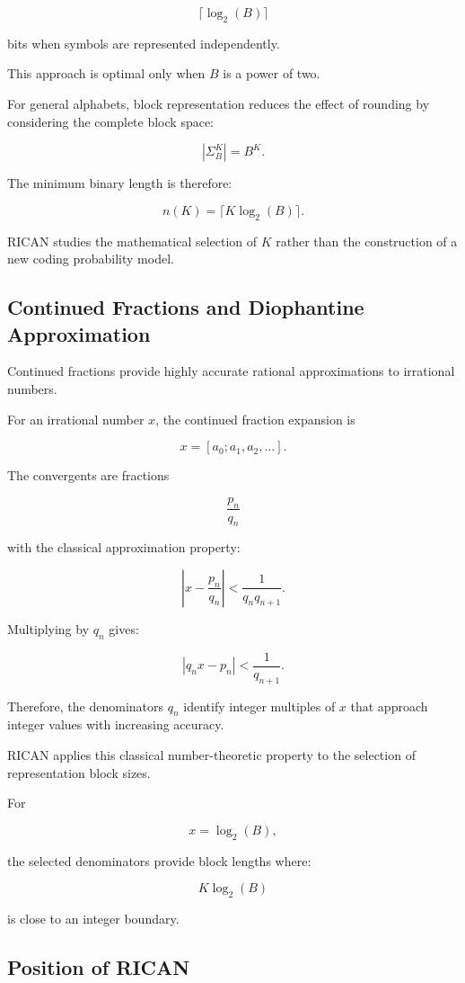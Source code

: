 \documentclass[onecolumn]{IEEEtran}
\begin{document}
\[
\lceil\log_2(B)\rceil
\]

bits when symbols are represented independently.

This approach is optimal only when $B$ is a power of two.

For general alphabets, block representation reduces the effect of
rounding by considering the complete block space:

\[
|\Sigma_B^K|=B^K .
\]

The minimum binary length is therefore:

\[
n(K)=\lceil K\log_2(B)\rceil .
\]

RICAN studies the mathematical selection of $K$ rather than the
construction of a new coding probability model.

\subsection{Continued Fractions and Diophantine Approximation}

Continued fractions provide highly accurate rational approximations to
irrational numbers.

For an irrational number $x$, the continued fraction expansion is

\[
x=[a_0;a_1,a_2,\ldots].
\]

The convergents are fractions

\[
\frac{p_n}{q_n}
\]

with the classical approximation property:

\[
\left|
x-\frac{p_n}{q_n}
\right|
<
\frac{1}{q_nq_{n+1}} .
\]

Multiplying by $q_n$ gives:

\[
|q_nx-p_n|
<
\frac{1}{q_{n+1}} .
\]

Therefore, the denominators $q_n$ identify integer multiples of
$x$ that approach integer values with increasing accuracy.

RICAN applies this classical number-theoretic property to the
selection of representation block sizes.

For

\[
x=\log_2(B),
\]

the selected denominators provide block lengths where:

\[
K\log_2(B)
\]

is close to an integer boundary.

\subsection{Position of RICAN}
\end{document}
